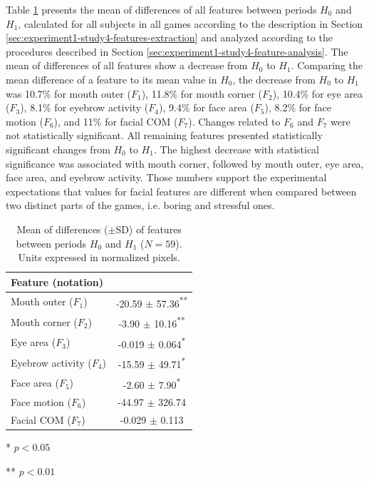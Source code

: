 Table \ref{table:changes} presents the mean of differences of all features between periods $H_0$ and $H_1$, calculated for all subjects in all games according to the description in Section \ref{sec:experiment1-study4-features-extraction} and analyzed according to the procedures described in Section \ref{sec:experiment1-study4-feature-analysis}. The mean of differences of all features show a decrease from $H_0$ to $H_1$. Comparing the mean difference of a feature to its mean value in $H_0$, the decrease from $H_0$ to $H_1$ was 10.7\% for mouth outer ($F_1$), 11.8\% for mouth corner ($F_2$), 10.4\% for eye area ($F_3$), 8.1\% for eyebrow activity ($F_4$), 9.4\% for face area ($F_5$), 8.2\% for face motion ($F_6$), and 11\% for facial COM ($F_7$). Changes related to $F_6$ and $F_7$ were not statistically significant. All remaining features presented statistically significant changes from $H_0$ to $H_1$. The highest decrease with statistical significance was associated with mouth corner, followed by mouth outer, eye area, face area, and eyebrow activity. Those numbers support the experimental expectations that values for facial features are different when compared between two distinct parts of the games, i.e. boring and stressful ones.

\begin{table}
    \caption{Mean of differences ($\pm$SD) of features between periods $H_0$ and $H_1$ ($N=59$). Units expressed in normalized pixels.}
    \label{table:changes}
    \centering
    \begin{threeparttable}
        \begin{tabular}{lc}
            \toprule%
                \textbf{Feature (notation)} &  \\
            \midrule%
                Mouth outer ($F_1$)      & -20.59 $\pm$ 57.36\textsuperscript{**} \\
                Mouth corner ($F_2$)     & -3.90 $\pm$ 10.16\textsuperscript{**} \\
                Eye area ($F_3$)         & -0.019 $\pm$ 0.064\textsuperscript{*} \\
                Eyebrow activity ($F_4$) & -15.59 $\pm$ 49.71\textsuperscript{*} \\
                Face area ($F_5$)        & -2.60 $\pm$ 7.90\textsuperscript{*} \\
                Face motion ($F_6$)      & -44.97 $\pm$ 326.74 \\
                Facial COM ($F_7$)       & -0.029 $\pm$ 0.113 \\
            \bottomrule%
        \end{tabular}
        \begin{tablenotes}
          \small
          \item[*]{$p < 0.05$}
          \item[**]{$p < 0.01$}
        \end{tablenotes}
    \end{threeparttable}
\end{table}


